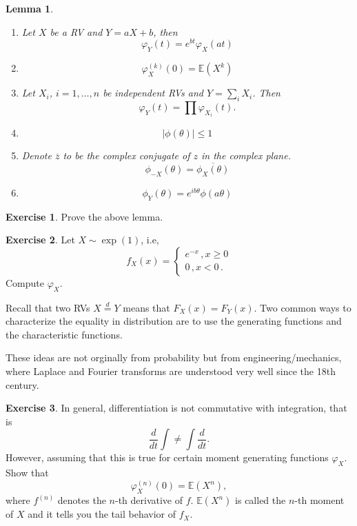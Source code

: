 \documentclass[
  openany]{book}
\newtheorem{lemma}{Lemma}[chapter]
\theoremstyle{definition}
\theoremstyle{definition}
\theoremstyle{definition}
\newtheorem{exercise}{Exercise}[chapter]
\theoremstyle{definition}
\theoremstyle{remark}
\begin{document}
\begin{lemma}
\leavevmode

\begin{enumerate}
\def\labelenumi{\arabic{enumi}.}
\item
  Let \(X\) be a RV and \(Y = aX + b\), then
  \[ \varphi_Y(t) = e^{bt} \varphi_{X}(at)\]
\item
  \[ \varphi_X^{(k)}(0) = \mathbb{E}(X^k) \]
\item
  Let \(X_i\), \(i= 1, \dots, n\) be independent RVs and \(Y = \sum_i X_i\).
  Then
  \[ \varphi_Y (t) = \prod \varphi_{X_i}(t). \]
\item
  \[| \phi (\theta) | \leq 1\]
\item
  Denote \(\overline{z}\) to be the complex conjugate of \(z\) in the complex plane.
  \[ \phi_{-X} (\theta) = \overline{\phi_X (\theta)} \]
\item
  \[\phi_Y (\theta) = e^{i b \theta} \phi(a\theta) \]
\end{enumerate}

\end{lemma}

\begin{exercise}
Prove the above lemma.
\end{exercise}

\begin{exercise}
Let \(X \sim \exp(1)\), i.e,
\[ f_X(x) = \begin{cases} e^{-x} \,, x \geq 0 \\ 0 \,, x < 0 \,. \end{cases}\]
Compute \(\varphi_X\).
\end{exercise}

Recall that two RVs \(X \stackrel{d}{=}Y\) means that \(F_X (x) = F_Y(x)\).
Two common ways to characterize the equality in distribution are
to use the generating functions and the characteristic functions.

These ideas are not orginally from probability but from engineering/mechanics, where Laplace and Fourier transforms are understood very well
since the 18th century.

\begin{exercise}
\protect\hypertarget{exr:moments}{}\label{exr:moments}In general, differentiation is not commutative with integration, that is
\[ \frac{d}{dt} \int \not= \int \frac{d}{dt}. \]
However, assuming that this is true for certain moment generating functions \(\varphi_X\).
Show that
\[ \varphi_X^{(n)}(0) = \mathbb{E}( X^n),\]
where \(f^{(n)}\) denotes the \(n\)-th derivative of \(f\).
\(\mathbb{E}(X^n)\) is called the \(n\)-th moment of \(X\) and it tells you the tail behavior of \(f_X\).
\end{exercise}
\end{document}
